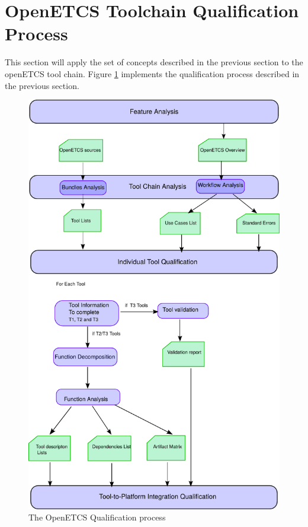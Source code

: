 \section{OpenETCS Toolchain Qualification Process}
\label{sec:toolchain-qualification-process}

This section will apply the set of concepts described in the previous
section to the openETCS tool chain.
Figure \ref{fig:openetcs-process} implements the qualification process
described in the previous section.

\begin{figure}[htbp]
\includegraphics[width=\textwidth]{openETCS_process.pdf}
\caption{\label{fig:openetcs-process} The OpenETCS Qualification process}
\end{figure}

